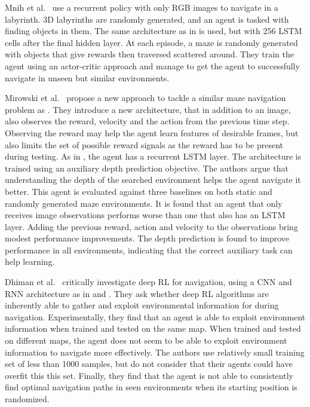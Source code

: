 Mnih et al.~\cite{mnih_asynchronous_2016} use a recurrent policy with only RGB images to navigate in a labyrinth.
3D labyrinths are randomly generated, and an agent is tasked with finding objects in them.
The same architecture as in \cite{mnih_human-level_2015} is used, but with 256 LSTM cells after the final hidden layer.
At each episode, a maze is randomly generated with objects that give rewards then traversed scattered around.
They train the agent using an actor-critic approach and manage to get the agent to successfully navigate in unseen but similar environments.

Mirowski et al.~\cite{mirowski_learning_2017} propose a new approach to tackle a similar maze navigation problem as \cite{mnih_asynchronous_2016}.
They introduce a new architecture, that in addition to an image, also observes the reward, velocity and the action from the previous time step.
Observing the reward may help the agent learn features of desirable frames, but also limits the set of possible reward signals as the reward has to be present during testing.
As in \cite{mnih_asynchronous_2016}, the agent has a recurrent LSTM layer. 
The architecture is trained using an auxiliary depth prediction objective.
The authors argue that understanding the depth of the searched environment helps the agent navigate it better.
This agent is evaluated against three baselines on both static and randomly generated maze environments.
It is found that an agent that only receives image observations performs worse than one that also has an LSTM layer.
Adding the previous reward, action and velocity to the observations bring modest performance improvements.
The depth prediction is found to improve performance in all environments, indicating that the correct auxiliary task can help learning.

Dhiman et al.~\cite{dhiman_critical_2019} critically investigate deep RL for navigation, using a CNN and RNN architecture as in \cite{hausknecht_deep_2017} and \cite{mirowski_learning_2017}.
They ask whether deep RL algorithms are inherently able to gather and exploit environmental information for during navigation.
Experimentally, they find that an agent is able to exploit environment information when trained and tested on the same map.
When trained and tested on different maps, the agent does not seem to be able to exploit environment information to navigate more effectively.
The authors use relatively small training set of less than 1000 samples, but do not consider that their agents could have overfit this this set.
Finally, they find that the agent is not able to consistently find optimal navigation paths in seen environments when its starting position is randomized.

